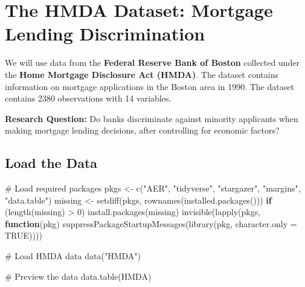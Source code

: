\documentclass[
  12pt,
  letterpaper,
]{scrbook}
\newenvironment{Shaded}{\begin{snugshade}}{\end{snugshade}}
\newcommand{\AttributeTok}[1]{\textcolor[rgb]{0.40,0.45,0.13}{#1}}
\newcommand{\CommentTok}[1]{\textcolor[rgb]{0.37,0.37,0.37}{#1}}
\newcommand{\ConstantTok}[1]{\textcolor[rgb]{0.56,0.35,0.01}{#1}}
\newcommand{\ControlFlowTok}[1]{\textcolor[rgb]{0.00,0.23,0.31}{\textbf{#1}}}
\newcommand{\DecValTok}[1]{\textcolor[rgb]{0.68,0.00,0.00}{#1}}
\newcommand{\FunctionTok}[1]{\textcolor[rgb]{0.28,0.35,0.67}{#1}}
\newcommand{\NormalTok}[1]{\textcolor[rgb]{0.00,0.23,0.31}{#1}}
\newcommand{\OtherTok}[1]{\textcolor[rgb]{0.00,0.23,0.31}{#1}}
\newcommand{\SpecialCharTok}[1]{\textcolor[rgb]{0.37,0.37,0.37}{#1}}
\newcommand{\StringTok}[1]{\textcolor[rgb]{0.13,0.47,0.30}{#1}}
\theoremstyle{definition}
\theoremstyle{plain}
\theoremstyle{remark}
\begin{document}
\section{The HMDA Dataset: Mortgage Lending
Discrimination}\label{the-hmda-dataset-mortgage-lending-discrimination}

We will use data from the \textbf{Federal Reserve Bank of Boston}
collected under the \textbf{Home Mortgage Disclosure Act (HMDA)}. The
dataset contains information on mortgage applications in the Boston area
in 1990. The dataset contains 2380 observations with 14 variables.

\textbf{Research Question:} Do banks discriminate against minority
applicants when making mortgage lending decisions, after controlling for
economic factors?

\subsection{Load the Data}\label{load-the-data}

\begin{Shaded}
\begin{Highlighting}[]
\CommentTok{\# Load required packages}
\NormalTok{pkgs }\OtherTok{\textless{}{-}} \FunctionTok{c}\NormalTok{(}\StringTok{"AER"}\NormalTok{, }\StringTok{"tidyverse"}\NormalTok{, }\StringTok{"stargazer"}\NormalTok{, }\StringTok{"margins"}\NormalTok{, }\StringTok{"data.table"}\NormalTok{)}
\NormalTok{missing }\OtherTok{\textless{}{-}} \FunctionTok{setdiff}\NormalTok{(pkgs, }\FunctionTok{rownames}\NormalTok{(}\FunctionTok{installed.packages}\NormalTok{()))}
\ControlFlowTok{if}\NormalTok{ (}\FunctionTok{length}\NormalTok{(missing) }\SpecialCharTok{\textgreater{}} \DecValTok{0}\NormalTok{) }\FunctionTok{install.packages}\NormalTok{(missing)}
\FunctionTok{invisible}\NormalTok{(}\FunctionTok{lapply}\NormalTok{(pkgs, }\ControlFlowTok{function}\NormalTok{(pkg) }\FunctionTok{suppressPackageStartupMessages}\NormalTok{(}\FunctionTok{library}\NormalTok{(pkg, }\AttributeTok{character.only =} \ConstantTok{TRUE}\NormalTok{))))}

\CommentTok{\# Load HMDA data}
\FunctionTok{data}\NormalTok{(}\StringTok{"HMDA"}\NormalTok{)}

\CommentTok{\# Preview the data}
\FunctionTok{data.table}\NormalTok{(HMDA)}
\end{Highlighting}
\end{Shaded}
\end{document}
